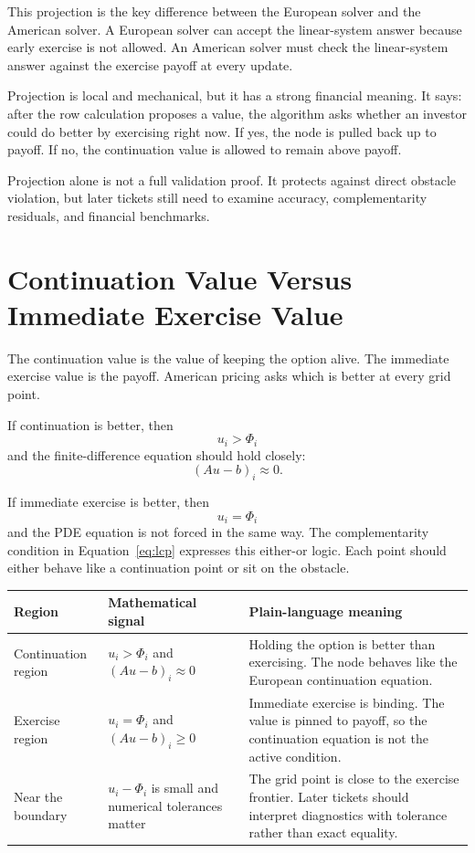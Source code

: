 \documentclass[11pt,a4paper]{article}
\begin{document}
This projection is the key difference between the European solver and the American solver. A
European solver can accept the linear-system answer because early exercise is not allowed. An
American solver must check the linear-system answer against the exercise payoff at every update.

Projection is local and mechanical, but it has a strong financial meaning. It says: after the row
calculation proposes a value, the algorithm asks whether an investor could do better by exercising
right now. If yes, the node is pulled back up to payoff. If no, the continuation value is allowed
to remain above payoff.

Projection alone is not a full validation proof. It protects against direct obstacle violation,
but later tickets still need to examine accuracy, complementarity residuals, and financial
benchmarks.

\section{Continuation Value Versus Immediate Exercise Value}

The continuation value is the value of keeping the option alive. The immediate exercise value is
the payoff. American pricing asks which is better at every grid point.

If continuation is better, then
\begin{equation}
  u_i > \Phi_i
\end{equation}
and the finite-difference equation should hold closely:
\begin{equation}
  (Au-b)_i \approx 0.
\end{equation}

If immediate exercise is better, then
\begin{equation}
  u_i = \Phi_i
\end{equation}
and the PDE equation is not forced in the same way. The complementarity condition in
Equation~\ref{eq:lcp} expresses this either-or logic. Each point should either behave like a
continuation point or sit on the obstacle.

\begin{longtable}{L{0.23\textwidth}L{0.31\textwidth}L{0.34\textwidth}}
\toprule
Region & Mathematical signal & Plain-language meaning \\
\midrule
\endhead
Continuation region &
\(u_i>\Phi_i\) and \((Au-b)_i\approx 0\) &
Holding the option is better than exercising. The node behaves like the European continuation
equation. \\
Exercise region &
\(u_i=\Phi_i\) and \((Au-b)_i\geq 0\) &
Immediate exercise is binding. The value is pinned to payoff, so the continuation equation is not
the active condition. \\
Near the boundary &
\(u_i-\Phi_i\) is small and numerical tolerances matter &
The grid point is close to the exercise frontier. Later tickets should interpret diagnostics with
tolerance rather than exact equality. \\
\bottomrule
\end{longtable}
\end{document}
